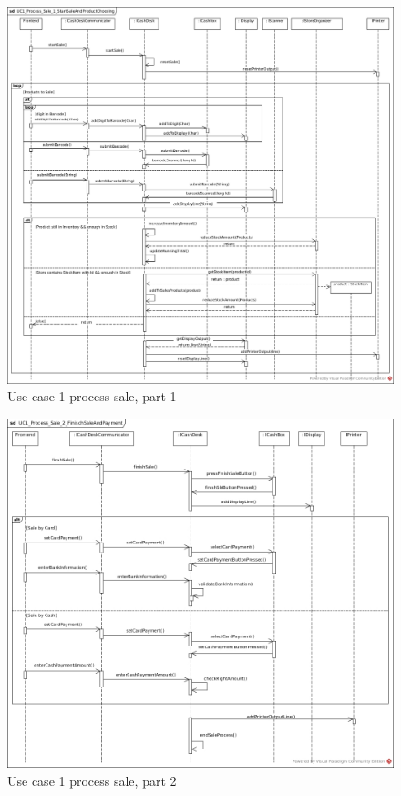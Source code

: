		
			\begin{figure}[!h]
				\centering
				\includegraphics[width = 1\textwidth]{img/UC1_Process_Sale_1_StartSaleAndProductChoosing.jpg}
				\caption{Use case 1 process sale, part 1}
				\label{MS_UC1_1}
			\end{figure}
			
			\begin{figure}[!h]
				\centering
				\includegraphics[width = 1\textwidth]{img/UC1_Process_Sale_2_FinishSaleAndPayment.jpg}
				\caption{Use case 1 process sale, part 2}
				\label{MS_UC1_2}
			\end{figure}
			
